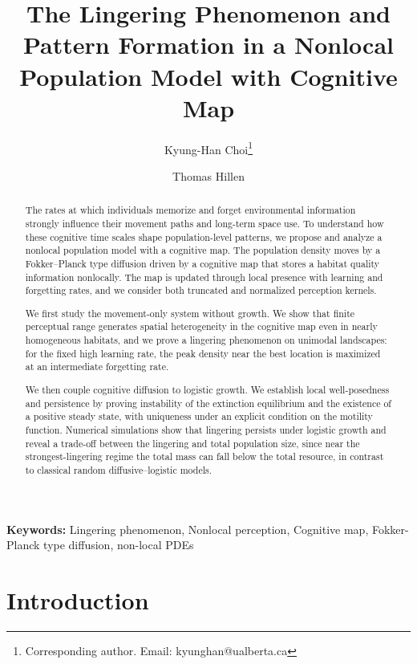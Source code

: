 \documentclass{article}
\title{The Lingering Phenomenon and Pattern Formation in a Nonlocal Population Model with Cognitive Map
}
\author[1]{Kyung-Han Choi\thanks{Corresponding author. Email: kyunghan@ualberta.ca}}
\author[1]{Thomas Hillen}
\affil[1]{Department of Mathematical and Statistical Sciences, 
University of Alberta, Edmonton, Alberta T6G 2G1, Canada}
\date{}
\begin{document}
\maketitle
\begin{abstract}
The rates at which individuals memorize and forget environmental information strongly influence their movement paths and long-term space use. 
To understand how these cognitive time scales shape population-level patterns, we propose and analyze a nonlocal population model with a cognitive map. 
The population density moves by a Fokker--Planck type diffusion driven by a cognitive map that stores a habitat quality information nonlocally. 
The map is updated through local presence with learning and forgetting rates, and we consider both truncated and normalized perception kernels.

We first study the movement-only system without growth. 
We show that finite perceptual range generates spatial heterogeneity in the cognitive map even in nearly homogeneous habitats, and we prove a lingering phenomenon on unimodal landscapes: for the fixed high learning rate, the peak density near the best location is maximized at an intermediate forgetting rate.

We then couple cognitive diffusion to logistic growth. 
We establish local well-posedness and persistence by proving instability of the extinction equilibrium and the existence of a positive steady state, with uniqueness under an explicit condition on the motility function.  
Numerical simulations show that lingering persists under logistic growth and reveal a trade-off between the lingering and total population size, since near the strongest-lingering regime the total mass can fall below the total resource, in contrast to classical random diffusive--logistic models.
\end{abstract}



\begin{flushleft}
\textbf{Keywords:} Lingering phenomenon, Nonlocal perception, 
Cognitive map, Fokker-Planck type diffusion, non-local PDEs
\end{flushleft}




\renewcommand{\thefootnote}{\fnsymbol{footnote}}
\tableofcontents

\section{Introduction}
\end{document}
